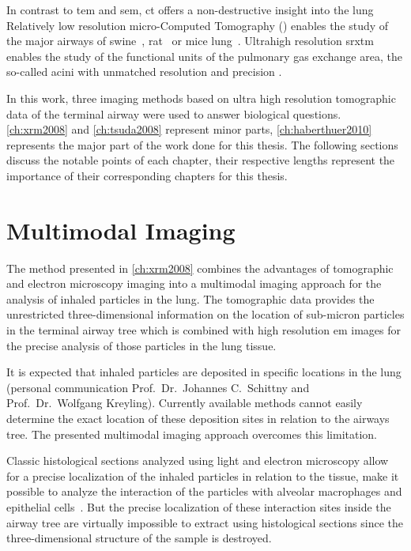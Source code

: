 In contrast to \ac{tem} and \ac{sem}, \ac{ct} offers a non-destructive insight into the lung Relatively low resolution micro-Com\-put\-ed Tomography () enables the study of the major airways of swine~\cite{Litzlbauer2006}, rat~\cite{Langheinrich2004a,Sharif2010} or mice lung~\cite{Langheinrich2004,Ritman2005}. Ultrahigh resolution \ac{srxtm} enables the study of the functional units of the pulmonary gas exchange area, the so-called acini with unmatched resolution and precision \cite{Tsuda2008,Haberthuer2010}.

In this work, three imaging methods based on ultra high resolution tomographic data of the terminal airway were used to answer biological questions. \autoref{ch:xrm2008} and \autoref{ch:tsuda2008} represent minor parts, \autoref{ch:haberthuer2010} represents the major part of the work done for this thesis. The following sections discuss the notable points of each chapter, their respective lengths represent the importance of their corresponding chapters for this thesis.

\section{Multimodal Imaging}\label{sec:multimodal imaging}
The method presented in \autoref{ch:xrm2008} combines the advantages of tomographic and electron microscopy imaging into a multimodal imaging approach for the analysis of inhaled particles in the lung. The tomographic data provides the unrestricted three-dimensional information on the location of sub-micron particles in the terminal airway tree which is combined with high resolution \ac{em} images for the precise analysis of those particles in the lung tissue.

It is expected that inhaled particles are deposited in specific locations in the lung (personal communication Prof.\ Dr.\ Johannes C.\ Schittny and Prof.\ Dr.\ Wolfgang Kreyling). Currently available methods cannot easily determine the exact location of these deposition sites in relation to the airways tree. The presented multimodal imaging approach overcomes this limitation.

Classic histological sections analyzed using light and electron microscopy allow for a precise localization of the inhaled particles in relation to the tissue, \ie make it possible to analyze the interaction of the particles with alveolar macrophages and epithelial cells~\cite{Muhlfeld2008}. But the precise localization of these interaction sites inside the airway tree are virtually impossible to extract using histological sections since the three-dimensional structure of the sample is destroyed.

